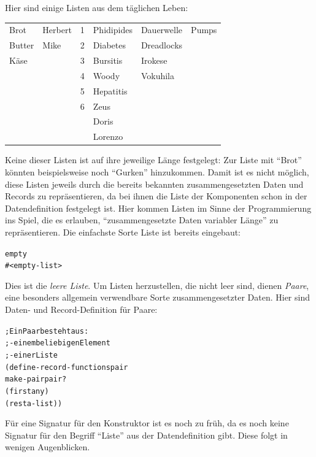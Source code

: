 Hier sind einige Listen aus dem täglichen Leben:
%
\begin{center}
  \begin{tabular}{l@{\qquad}l@{\qquad}l@{\qquad}l@{\qquad}l@{\qquad}l}
  Brot & Herbert & 1 & Phidipides & Dauerwelle & Pumps \\
  Butter & Mike & 2 & Diabetes & Dreadlocks \\
  Käse & & 3 & Bursitis & Irokese \\
  & & 4 & Woody & Vokuhila \\
  && 5 & Hepatitis \\
  && 6 & Zeus \\
  &&& Doris\\
  &&& Lorenzo
\end{tabular}
\end{center}
%
Keine dieser Listen ist auf ihre jeweilige Länge festgelegt: Zur Liste
mit "`Brot"' könnten beispielsweise noch "`Gurken"' hinzukommen.  Damit ist es
nicht möglich, diese Listen jeweils durch die bereits bekannten
zusammengesetzten Daten und Records zu repräsentieren, da bei ihnen
die Liste der Komponenten schon in der Datendefinition festgelegt
ist.  Hier kommen Listen im Sinne der Programmierung ins Spiel, die es
erlauben, "`zusammengesetzte Daten variabler Länge"' zu
repräsentieren.  Die einfachste Sorte Liste ist bereits eingebaut:
%
\begin{alltt}
empty
\evalsto{} #<empty-list>
\end{alltt}
%
Dies ist die \textit{leere Liste}.  Um Listen herzustellen, die nicht leer
sind, dienen \textit{Paare}, eine besonders allgemein
verwendbare Sorte zusammengesetzter Daten.  Hier sind Daten- und
Record-Definition für Paare:\label{def:pair}
%
\begin{alltt}
; Ein Paar besteht aus:
; - einem beliebigen Element
; - einer Liste
(define-record-functions pair
  make-pair pair?
  (first any)
  (rest a-list))\end{alltt}
%
Für eine Signatur für den Konstruktor ist es noch zu früh, da es noch
keine Signatur für den Begriff "`Liste"' aus der Datendefinition
gibt.  Diese folgt in wenigen Augenblicken.

